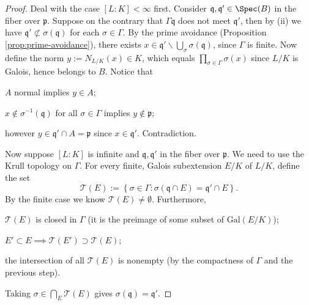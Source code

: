 \begin{proof}
	Deal with the case $[L:K] < \infty$ first. Consider $\mathfrak{q}, \mathfrak{q}' \in \Spec(B)$ in the fiber over $\mathfrak{p}$. Suppose on the contrary that $\Gamma \mathfrak{q}$ does not meet $\mathfrak{q}'$, then by (ii) we have $\mathfrak{q}' \not\subset \sigma(\mathfrak{q})$ for each $\sigma \in \Gamma$. By the prime avoidance (Proposition \ref{prop:prime-avoidance}), there exists $x \in \mathfrak{q}' \smallsetminus \bigcup_\sigma \sigma(\mathfrak{q})$, since $\Gamma$ is finite. Now define the norm $y := N_{L/K}(x) \in K$, which equals $\prod_{\sigma \in \Gamma} \sigma(x)$ since $L/K$ is Galois, hence belongs to $B$. Notice that
	\begin{compactitem}
		\item $A$ normal implies $y \in A$;
		\item $x \notin \sigma^{-1}(\mathfrak{q})$ for all $\sigma \in \Gamma$ implies $y \notin \mathfrak{p}$;
		\item however $y \in \mathfrak{q}' \cap A = \mathfrak{p}$ since $x \in \mathfrak{q}'$. Contradiction.
	\end{compactitem}
	
	Now suppose $[L:K]$ is infinite and $\mathfrak{q}, \mathfrak{q}'$ in the fiber over $\mathfrak{p}$. We need to use the Krull topology on $\Gamma$. For every finite, Galois subextension $E/K$ of $L/K$, define the set
	\[ \mathcal{T}(E) := \left\{ \sigma \in \Gamma: \sigma(\mathfrak{q} \cap E) = \mathfrak{q}' \cap E \right\}.  \]
	By the finite case we know $\mathcal{T}(E) \neq \emptyset$. Furthermore,
	\begin{compactitem}
		\item $\mathcal{T}(E)$ is closed in $\Gamma$ (it is the preimage of some subset of $\text{Gal}(E/K)$);
		\item $E' \subset E \implies \mathcal{T}(E') \supset \mathcal{T}(E)$;
		\item the intersection of all $\mathcal{T}(E)$ is nonempty (by the compactness of $\Gamma$ and the previous step).
	\end{compactitem}
	Taking $\sigma \in \bigcap_E \mathcal{T}(E)$ gives $\sigma(\mathfrak{q}) = \mathfrak{q}'$.


\end{proof}
